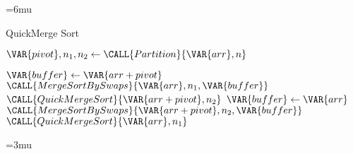 \begin{algorithm}
	\unboldmath
	\thinmuskip=6mu
	\caption{QuickMerge Sort}
	\begin{algorithmic}[1]
		
		\State
		  
		\EndIf
		
		\State
		\State $\VAR{pivot}, n_1, n_2 \gets \CALL{Partition}{\VAR{arr}, n}$ 
		
		\State
		 
			\State $\VAR{buffer} \gets \VAR{arr+pivot}$
			\State $\CALL{MergeSortBySwaps}{\VAR{arr}, n_1, \VAR{buffer}}$
			\State $\CALL{QuickMergeSort}{\VAR{arr+pivot}, n_2}$
		\Else
			\State $\VAR{buffer} \gets \VAR{arr}$
			\State $\CALL{MergeSortBySwaps}{\VAR{arr+pivot}, n_2, \VAR{buffer}}$
			\State $\CALL{QuickMergeSort}{\VAR{arr}, n_1}$
		\EndIf
		
		\EndProcedure
	\end{algorithmic}
	\boldmath
	\thinmuskip=3mu
	\label{pseudocode:quick-merge-sort}
\end{algorithm}
